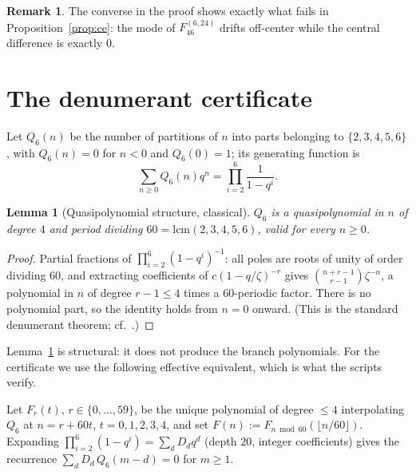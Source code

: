 \documentclass[11pt,reqno]{article}
\newtheorem{lemma}[theorem]{Lemma}
\theoremstyle{definition}
\newtheorem{remark}[theorem]{Remark}
\begin{document}
\begin{remark}\label{rem:ce-mech}
The converse in the proof shows exactly what fails in Proposition~\ref{prop:ce}: the mode of $F^{(6,24)}_{46}$ drifts off-center while the central difference is exactly $0$.
\end{remark}

\section{The denumerant certificate}\label{sec:qp}
Let $Q_6(n)$ be the number of partitions of $n$ into parts belonging to $\{2,3,4,5,6\}$, with $Q_6(n)=0$ for $n<0$ and $Q_6(0)=1$; its generating function is
\[
\sum_{n\ge0}Q_6(n)q^n=\prod_{i=2}^{6}\frac1{1-q^i}.
\]

\begin{lemma}[Quasipolynomial structure, classical]\label{lem:qp-classical}
$Q_6$ is a quasipolynomial in $n$ of degree $4$ and period dividing $60=\mathrm{lcm}(2,3,4,5,6)$, valid for every $n\ge0$.
\end{lemma}
\begin{proof}
Partial fractions of $\prod_{i=2}^6(1-q^i)^{-1}$: all poles are roots of unity of order dividing $60$, and extracting coefficients of $c(1-q/\zeta)^{-r}$ gives $\binom{n+r-1}{r-1}\zeta^{-n}$, a polynomial in $n$ of degree $r-1\le 4$ times a $60$-periodic factor. There is no polynomial part, so the identity holds from $n=0$ onward. (This is the standard denumerant theorem; cf.\ \cite{KR}.)
\end{proof}

Lemma~\ref{lem:qp-classical} is structural: it does not produce the branch polynomials. For the certificate we use the following effective equivalent, which is what the scripts verify.

Let $F_r(t)$, $r\in\{0,\dots,59\}$, be the unique polynomial of degree $\le4$ interpolating $Q_6$ at $n=r+60t$, $t=0,1,2,3,4$, and set $F(n):=F_{n\bmod 60}(\lfloor n/60\rfloor)$. Expanding $\prod_{i=2}^6(1-q^i)=\sum_d D_d q^d$ (depth $20$, integer coefficients) gives the recurrence $\sum_d D_d\,Q_6(m-d)=0$ for $m\ge1$.
\end{document}
